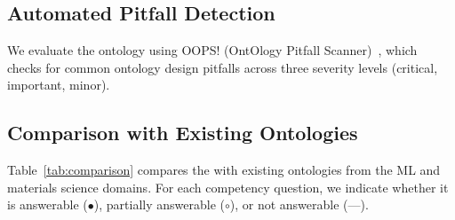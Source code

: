 \subsection{Automated Pitfall Detection}
\label{sec:eval-oops}

We evaluate the ontology using OOPS! (OntOlogy Pitfall
Scanner)~\cite{poveda2014oops}, which checks for common ontology design
pitfalls across three severity levels (critical, important, minor).



\subsection{Comparison with Existing Ontologies}
\label{sec:eval-comparison}

Table~\ref{tab:comparison} compares the \MLIPsOntology{} with existing
ontologies from the ML and materials science domains. For each competency
question, we indicate whether it is answerable ($\bullet$), partially
answerable ($\circ$), or not answerable (---).


